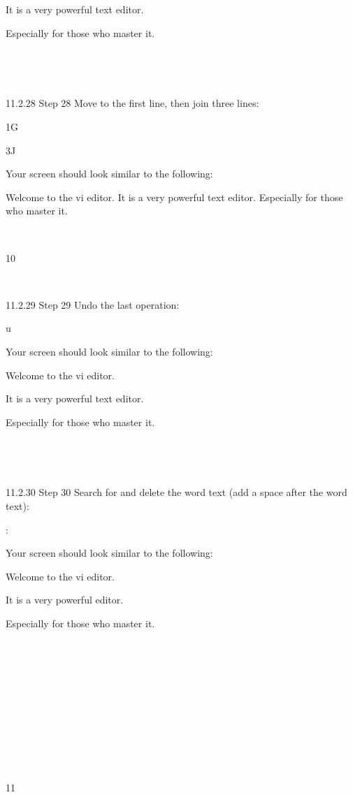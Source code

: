 It is a very powerful text editor.

Especially for those who master it.

~

~

11.2.28 Step 28
Move to the first line, then join three lines:

1G

3J

Your screen should look similar to the following:

Welcome to the vi editor. It is a very powerful text editor. Especially for
those who master it.

~

10



~

11.2.29 Step 29
Undo the last operation:

u

Your screen should look similar to the following:

Welcome to the vi editor.

It is a very powerful text editor.

Especially for those who master it.

~

~

11.2.30 Step 30
Search for and delete the word text (add a space after the word text):

:%

Your screen should look similar to the following:

Welcome to the vi editor.

It is a very powerful editor.

Especially for those who master it.

~

~

~

~

~

~

11



~

~

~

~

~

~

~

~

~

~

